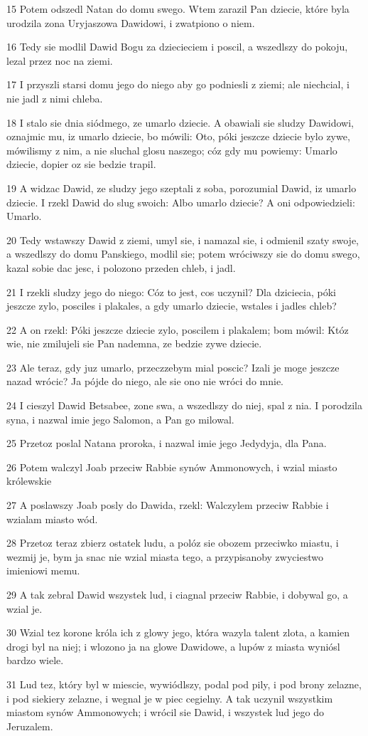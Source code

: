 \par 15 Potem odszedl Natan do domu swego. Wtem zarazil Pan dziecie, które byla urodzila zona Uryjaszowa Dawidowi, i zwatpiono o niem.
\par 16 Tedy sie modlil Dawid Bogu za dziecieciem i poscil, a wszedlszy do pokoju, lezal przez noc na ziemi.
\par 17 I przyszli starsi domu jego do niego aby go podniesli z ziemi; ale niechcial, i nie jadl z nimi chleba.
\par 18 I stalo sie dnia siódmego, ze umarlo dziecie. A obawiali sie sludzy Dawidowi, oznajmic mu, iz umarlo dziecie, bo mówili: Oto, póki jeszcze dziecie bylo zywe, mówilismy z nim, a nie sluchal glosu naszego; cóz gdy mu powiemy: Umarlo dziecie, dopier oz sie bedzie trapil.
\par 19 A widzac Dawid, ze sludzy jego szeptali z soba, porozumial Dawid, iz umarlo dziecie. I rzekl Dawid do slug swoich: Albo umarlo dziecie? A oni odpowiedzieli: Umarlo.
\par 20 Tedy wstawszy Dawid z ziemi, umyl sie, i namazal sie, i odmienil szaty swoje, a wszedlszy do domu Panskiego, modlil sie; potem wróciwszy sie do domu swego, kazal sobie dac jesc, i polozono przeden chleb, i jadl.
\par 21 I rzekli sludzy jego do niego: Cóz to jest, cos uczynil? Dla dziciecia, póki jeszcze zylo, posciles i plakales, a gdy umarlo dziecie, wstales i jadles chleb?
\par 22 A on rzekl: Póki jeszcze dziecie zylo, poscilem i plakalem; bom mówil: Któz wie, nie zmilujeli sie Pan nademna, ze bedzie zywe dziecie.
\par 23 Ale teraz, gdy juz umarlo, przeczzebym mial poscic? Izali je moge jeszcze nazad wrócic? Ja pójde do niego, ale sie ono nie wróci do mnie.
\par 24 I cieszyl Dawid Betsabee, zone swa, a wszedlszy do niej, spal z nia. I porodzila syna, i nazwal imie jego Salomon, a Pan go milowal.
\par 25 Przetoz poslal Natana proroka, i nazwal imie jego Jedydyja, dla Pana.
\par 26 Potem walczyl Joab przeciw Rabbie synów Ammonowych, i wzial miasto królewskie
\par 27 A poslawszy Joab posly do Dawida, rzekl: Walczylem przeciw Rabbie i wzialam miasto wód.
\par 28 Przetoz teraz zbierz ostatek ludu, a polóz sie obozem przeciwko miastu, i wezmij je, bym ja snac nie wzial miasta tego, a przypisanoby zwyciestwo imieniowi memu.
\par 29 A tak zebral Dawid wszystek lud, i ciagnal przeciw Rabbie, i dobywal go, a wzial je.
\par 30 Wzial tez korone króla ich z glowy jego, która wazyla talent zlota, a kamien drogi byl na niej; i wlozono ja na glowe Dawidowe, a lupów z miasta wyniósl bardzo wiele.
\par 31 Lud tez, który byl w miescie, wywiódlszy, podal pod pily, i pod brony zelazne, i pod siekiery zelazne, i wegnal je w piec cegielny. A tak uczynil wszystkim miastom synów Ammonowych; i wrócil sie Dawid, i wszystek lud jego do Jeruzalem.


